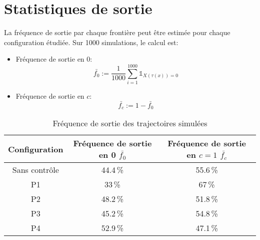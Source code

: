 \section*{Statistiques de sortie}
La fréquence de sortie par chaque frontière peut être estimée pour chaque configuration étudiée. Sur 1000 simulations, le calcul est:
\begin{itemize}
    \item Fréquence de sortie en 0:
    \[\bar{f_0}:=\frac{1}{1000}\sum_{i=1}^{1000}\mathds{1}_{X(\tau(x))=0}\]
    \item Fréquence de sortie en $c$:
    \[\bar{f_c}:=1-\bar{f_0}\]
\end{itemize}
\begin{table}[htb]
    \centering
    \caption{Fréquence de sortie des trajectoires simulées}\label{tab:simulation_exit_frequency}
    \renewcommand{\arraystretch}{1.4}
    \begin{tabular}{||c|c|c||}
        \hline
        Configuration & Fréquence de sortie en 0 $\bar{f_0}$ & Fréquence de sortie en $c=1$ $\bar{f_c}$ \\
        \hline\hline
        Sans contrôle & 44.4\,\% & 55.6\,\% \\
        P1 & 33\,\% & 67\,\% \\
        P2 & 48.2\,\% & 51.8\,\% \\
        P3 & 45.2\,\% & 54.8\,\% \\
        P4 & 52.9\,\% & 47.1\,\% \\
        \hline
    \end{tabular}
\end{table}
